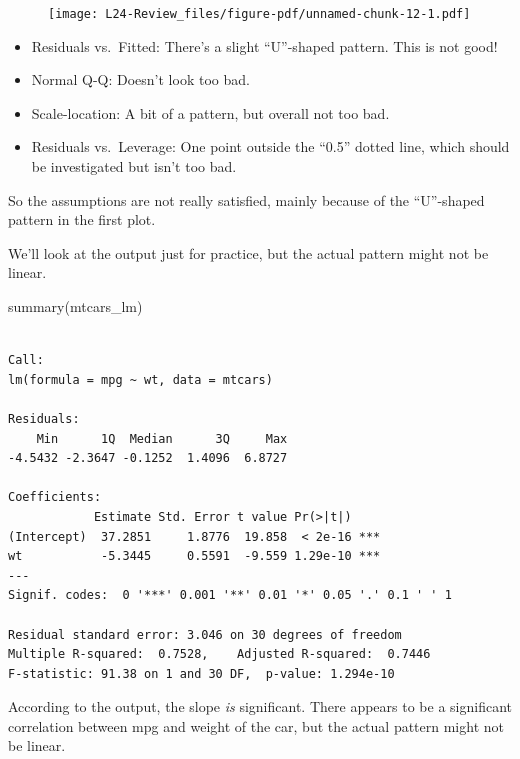 \documentclass[
  letterpaper,
  DIV=11,
  numbers=noendperiod,
  oneside]{scrreprt}
\newenvironment{Shaded}{\begin{snugshade}}{\end{snugshade}}
\newcommand{\FunctionTok}[1]{\textcolor[rgb]{0.28,0.35,0.67}{#1}}
\newcommand{\NormalTok}[1]{\textcolor[rgb]{0.00,0.23,0.31}{#1}}
\providecommand{\tightlist}{%
  \setlength{\itemsep}{0pt}\setlength{\parskip}{0pt}}\usepackage{longtable,booktabs,array}
\begin{document}
\begin{figure}[H]

{\centering \texttt{[image: L24-Review\_files/figure-pdf/unnamed-chunk-12-1.pdf]}

}

\end{figure}

\begin{itemize}
\tightlist
\item
  Residuals vs.~Fitted: There's a slight ``U''-shaped pattern. This is
  not good!
\item
  Normal Q-Q: Doesn't look too bad.
\item
  Scale-location: A bit of a pattern, but overall not too bad.
\item
  Residuals vs.~Leverage: One point outside the ``0.5'' dotted line,
  which should be investigated but isn't too bad.
\end{itemize}

So the assumptions are not really satisfied, mainly because of the
``U''-shaped pattern in the first plot.

We'll look at the output just for practice, but the actual pattern might
not be linear.

\begin{Shaded}
\begin{Highlighting}[]
\FunctionTok{summary}\NormalTok{(mtcars\_lm)}
\end{Highlighting}
\end{Shaded}

\begin{verbatim}

Call:
lm(formula = mpg ~ wt, data = mtcars)

Residuals:
    Min      1Q  Median      3Q     Max 
-4.5432 -2.3647 -0.1252  1.4096  6.8727 

Coefficients:
            Estimate Std. Error t value Pr(>|t|)    
(Intercept)  37.2851     1.8776  19.858  < 2e-16 ***
wt           -5.3445     0.5591  -9.559 1.29e-10 ***
---
Signif. codes:  0 '***' 0.001 '**' 0.01 '*' 0.05 '.' 0.1 ' ' 1

Residual standard error: 3.046 on 30 degrees of freedom
Multiple R-squared:  0.7528,    Adjusted R-squared:  0.7446 
F-statistic: 91.38 on 1 and 30 DF,  p-value: 1.294e-10
\end{verbatim}

According to the output, the slope \emph{is} significant. There appears
to be a significant correlation between mpg and weight of the car, but
the actual pattern might not be linear.
\end{document}
